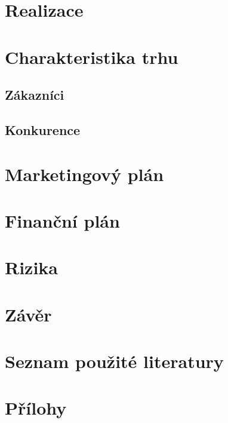 \documentclass[12pt, a4paper]{article}
\begin{document}
\section{Realizace}
\section{Charakteristika trhu}
\subsection{Zákazníci}
\subsection{Konkurence}
\section{Marketingový plán}
\section{Finanční plán}
\section{Rizika}
\section{Závěr}
\section{Seznam použité literatury}
\printbibliography[heading=none]
\section{Přílohy}
\end{document}
